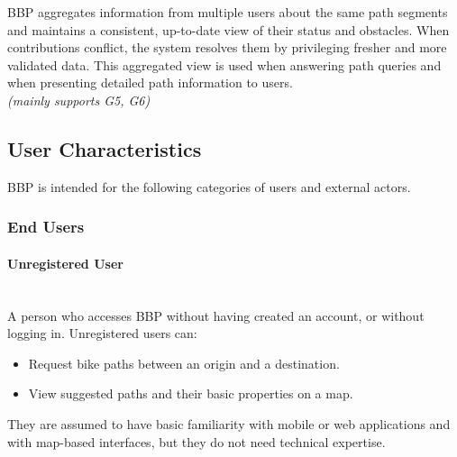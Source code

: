 \begin{description}[style=nextline,itemsep=0.9em,labelwidth=4.5em,leftmargin=!,labelsep=0.6em]
    \item[F6 --- Aggregation and Maintenance of Path Knowledge]
    BBP aggregates information from multiple users about the same path segments and maintains a consistent, up-to-date view of their status and obstacles. When contributions conflict, the system resolves them by privileging fresher and more validated data. This aggregated view is used when answering path queries and when presenting detailed path information to users.\\
    \textit{(mainly supports G5, G6)}
\end{description}


\subsection{User Characteristics}
BBP is intended for the following categories of users and external actors.

\subsubsection{End Users}

\paragraph{Unregistered User}
\mbox{}\\
A person who accesses BBP without having created an account, or without logging in. Unregistered users can:
\begin{itemize}[nosep,leftmargin=1.4em]
    \item Request bike paths between an origin and a destination.
    \item View suggested paths and their basic properties on a map.
\end{itemize}
They are assumed to have basic familiarity with mobile or web applications and with map-based interfaces, but they do not need technical expertise.

